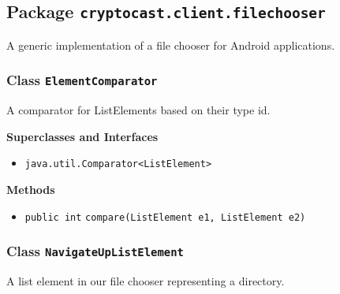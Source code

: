 \subsection{Package \lstinline!cryptocast.client.filechooser!}
A generic implementation of a file chooser for Android applications.

\subsubsection{Class \lstinline|ElementComparator|}
A comparator for ListElements based on their type id. \\
\noindent\begin{minipage}[t]{5cm}
\vspace{0.3em}
\hspace*{2em}
\vspace{0.3em}
\end{minipage}



\textbf{\sffamily Superclasses and Interfaces}
\begin{itemize}
\item \lstinline|java.util.Comparator<ListElement>|
\end{itemize}



\textbf{\sffamily Methods}
\begin{itemize}
\item \lstinline|public int| \lstinline|compare|\lstinline|(ListElement e1, ListElement e2)| \\[-0.6em]




\end{itemize}

\subsubsection{Class \lstinline|NavigateUpListElement|}
A list element in our file chooser representing a directory. \\
\noindent\begin{minipage}[t]{5cm}
\vspace{0.3em}
\hspace*{2em}
\vspace{0.3em}
\end{minipage}




